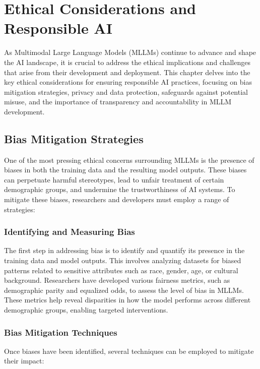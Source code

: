 
\chapter{Ethical Considerations and Responsible AI}

As Multimodal Large Language Models (MLLMs) continue to advance and shape the AI landscape, it is crucial to address the ethical implications and challenges that arise from their development and deployment. This chapter delves into the key ethical considerations for ensuring responsible AI practices, focusing on bias mitigation strategies, privacy and data protection, safeguards against potential misuse, and the importance of transparency and accountability in MLLM development.

\section{Bias Mitigation Strategies}

One of the most pressing ethical concerns surrounding MLLMs is the presence of biases in both the training data and the resulting model outputs. These biases can perpetuate harmful stereotypes, lead to unfair treatment of certain demographic groups, and undermine the trustworthiness of AI systems. To mitigate these biases, researchers and developers must employ a range of strategies:

\subsection{Identifying and Measuring Bias}

The first step in addressing bias is to identify and quantify its presence in the training data and model outputs. This involves analyzing datasets for biased patterns related to sensitive attributes such as race, gender, age, or cultural background. Researchers have developed various fairness metrics, such as demographic parity and equalized odds, to assess the level of bias in MLLMs. These metrics help reveal disparities in how the model performs across different demographic groups, enabling targeted interventions.

\subsection{Bias Mitigation Techniques}

Once biases have been identified, several techniques can be employed to mitigate their impact:

